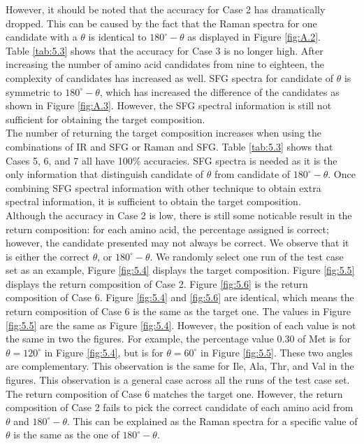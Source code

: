 However, it should be noted that the accuracy for Case 2 has dramatically dropped. This can be caused by the fact that the Raman spectra for one candidate with a $\theta$ is identical to $180^{\circ}-\theta$ as displayed in Figure \ref{fig:A.2}. \\

Table \ref{tab:5.3} shows that the accuracy for Case 3 is no longer high. After increasing the number of amino acid candidates from nine to eighteen, the complexity of candidates has increased as well. SFG spectra for candidate of $\theta$ is symmetric to $180^{\circ}-\theta$, which has increased the difference of the candidates as shown in Figure \ref{fig:A.3}. However, the SFG spectral information is still not sufficient for obtaining the target composition. \\

The number of returning the target composition increases when using the combinations of IR and SFG or Raman and SFG. Table \ref{tab:5.3} shows that Cases 5, 6, and 7 all have 100\% accuracies. SFG spectra is needed as it is the only information that distinguish candidate of $\theta$ from candidate of $180^{\circ}-\theta$. Once combining SFG spectral information with other technique to obtain extra spectral information, it is sufficient to obtain the target composition. \\

Although the accuracy in Case 2 is low, there is still some noticable result in the return composition: for each amino acid, the percentage assigned is correct; however, the candidate presented may not always be correct. We observe that it is either the correct $\theta$, or $180^{\circ}-\theta$. We randomly select one run of the test case set as an example, Figure \ref{fig:5.4} displays the target composition. Figure \ref{fig:5.5} displays the return composition of Case 2. Figure \ref{fig:5.6} is the return composition of Case 6. Figure \ref{fig:5.4} and \ref{fig:5.6} are identical, which means the return composition of Case 6 is the same as the target one. The values in Figure \ref{fig:5.5} are the same as Figure \ref{fig:5.4}. However, the position of each value is not the same in two the figures. For example, the percentage value $0.30$ of Met is for $\theta = 120^{\circ}$ in Figure \ref{fig:5.4}, but is for $\theta = 60^{\circ}$ in Figure \ref{fig:5.5}. These two angles are complementary. This observation is the same for Ile, Ala, Thr, and Val in the figures. This observation is a general case across all the runs of the test case set. The return composition of Case 6 matches the target one. However, the return composition of Case 2 fails to pick the correct candidate of each amino acid from $\theta$ and $180^{\circ}-\theta$. This can be explained as the Raman spectra for a specific value of $\theta$ is the same as the one of $180^{\circ}-\theta$. \\

